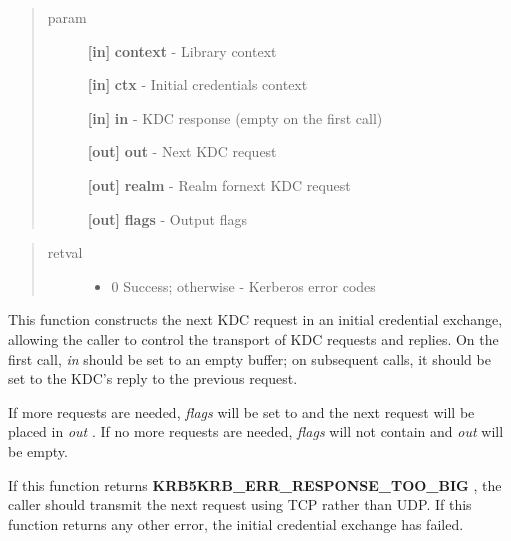 \documentclass[letterpaper,10pt,english]{sphinxmanual}
\begin{document}
\begin{quote}\begin{description}
\item[{param}] \leavevmode
\textbf{{[}in{]}} \textbf{context} - Library context

\textbf{{[}in{]}} \textbf{ctx} - Initial credentials context

\textbf{{[}in{]}} \textbf{in} - KDC response (empty on the first call)

\textbf{{[}out{]}} \textbf{out} - Next KDC request

\textbf{{[}out{]}} \textbf{realm} - Realm fornext KDC request

\textbf{{[}out{]}} \textbf{flags} - Output flags

\end{description}\end{quote}
\begin{quote}\begin{description}
\item[{retval}] \leavevmode\begin{itemize}
\item {} 
0   Success; otherwise - Kerberos error codes

\end{itemize}

\end{description}\end{quote}

This function constructs the next KDC request in an initial credential exchange, allowing the caller to control the transport of KDC requests and replies. On the first call, \emph{in} should be set to an empty buffer; on subsequent calls, it should be set to the KDC's reply to the previous request.

If more requests are needed, \emph{flags} will be set to {\hyperref[appdev/refs/macros/KRB5_INIT_CREDS_STEP_FLAG_CONTINUE:KRB5_INIT_CREDS_STEP_FLAG_CONTINUE]{}} and the next request will be placed in \emph{out} . If no more requests are needed, \emph{flags} will not contain {\hyperref[appdev/refs/macros/KRB5_INIT_CREDS_STEP_FLAG_CONTINUE:KRB5_INIT_CREDS_STEP_FLAG_CONTINUE]{}} and \emph{out} will be empty.

If this function returns \textbf{KRB5KRB\_ERR\_RESPONSE\_TOO\_BIG} , the caller should transmit the next request using TCP rather than UDP. If this function returns any other error, the initial credential exchange has failed.
\end{document}
